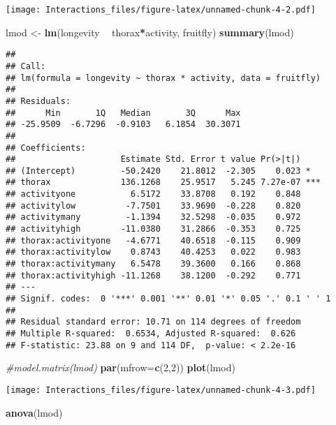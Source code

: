 \documentclass[
]{article}
\newenvironment{Shaded}{\begin{snugshade}}{\end{snugshade}}
\newcommand{\CommentTok}[1]{\textcolor[rgb]{0.56,0.35,0.01}{\textit{#1}}}
\newcommand{\DataTypeTok}[1]{\textcolor[rgb]{0.13,0.29,0.53}{#1}}
\newcommand{\DecValTok}[1]{\textcolor[rgb]{0.00,0.00,0.81}{#1}}
\newcommand{\KeywordTok}[1]{\textcolor[rgb]{0.13,0.29,0.53}{\textbf{#1}}}
\newcommand{\NormalTok}[1]{#1}
\newcommand{\OperatorTok}[1]{\textcolor[rgb]{0.81,0.36,0.00}{\textbf{#1}}}
\newcommand{\StringTok}[1]{\textcolor[rgb]{0.31,0.60,0.02}{#1}}
\begin{document}
\texttt{[image: Interactions\_files/figure-latex/unnamed-chunk-4-2.pdf]}

\begin{Shaded}
\begin{Highlighting}[]
\NormalTok{lmod <-}\StringTok{ }\KeywordTok{lm}\NormalTok{(longevity }\OperatorTok{~}\StringTok{ }\NormalTok{thorax}\OperatorTok{*}\NormalTok{activity, fruitfly)}
\KeywordTok{summary}\NormalTok{(lmod)}
\end{Highlighting}
\end{Shaded}

\begin{verbatim}
## 
## Call:
## lm(formula = longevity ~ thorax * activity, data = fruitfly)
## 
## Residuals:
##      Min       1Q   Median       3Q      Max 
## -25.9509  -6.7296  -0.9103   6.1854  30.3071 
## 
## Coefficients:
##                     Estimate Std. Error t value Pr(>|t|)    
## (Intercept)         -50.2420    21.8012  -2.305    0.023 *  
## thorax              136.1268    25.9517   5.245 7.27e-07 ***
## activityone           6.5172    33.8708   0.192    0.848    
## activitylow          -7.7501    33.9690  -0.228    0.820    
## activitymany         -1.1394    32.5298  -0.035    0.972    
## activityhigh        -11.0380    31.2866  -0.353    0.725    
## thorax:activityone   -4.6771    40.6518  -0.115    0.909    
## thorax:activitylow    0.8743    40.4253   0.022    0.983    
## thorax:activitymany   6.5478    39.3600   0.166    0.868    
## thorax:activityhigh -11.1268    38.1200  -0.292    0.771    
## ---
## Signif. codes:  0 '***' 0.001 '**' 0.01 '*' 0.05 '.' 0.1 ' ' 1
## 
## Residual standard error: 10.71 on 114 degrees of freedom
## Multiple R-squared:  0.6534, Adjusted R-squared:  0.626 
## F-statistic: 23.88 on 9 and 114 DF,  p-value: < 2.2e-16
\end{verbatim}

\begin{Shaded}
\begin{Highlighting}[]
\CommentTok{#model.matrix(lmod)}
\KeywordTok{par}\NormalTok{(}\DataTypeTok{mfrow=}\KeywordTok{c}\NormalTok{(}\DecValTok{2}\NormalTok{,}\DecValTok{2}\NormalTok{))}
\KeywordTok{plot}\NormalTok{(lmod)}
\end{Highlighting}
\end{Shaded}

\texttt{[image: Interactions\_files/figure-latex/unnamed-chunk-4-3.pdf]}

\begin{Shaded}
\begin{Highlighting}[]
\KeywordTok{anova}\NormalTok{(lmod)}
\end{Highlighting}
\end{Shaded}
\end{document}
